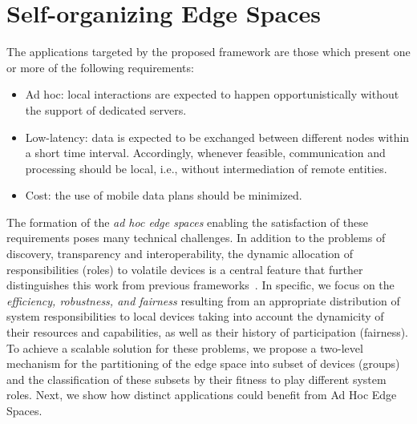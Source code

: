 \section{Self-organizing Edge Spaces}\label{sec:edge_spaces}


The applications targeted by the proposed framework are those which present one or more of the following requirements:

\begin{itemize}

\item Ad hoc: local interactions are expected to happen opportunistically without the support of dedicated servers.

\item Low-latency: data is expected to be exchanged between different nodes within a short time interval. Accordingly, whenever feasible, communication and processing should be local, i.e., without intermediation of remote entities.

\item Cost: the use of mobile data plans should be minimized.
%
%
%


\end{itemize}

The formation  of the \textit{ad hoc edge spaces} enabling the satisfaction of these requirements poses many technical challenges. In addition to the problems of discovery, transparency and interoperability, the dynamic allocation of responsibilities (roles) to volatile devices is a central feature that further distinguishes this work from previous frameworks~\cite{}. In specific, we focus on the \textit{efficiency, robustness, and fairness} resulting from an appropriate distribution of system responsibilities to local devices taking into account the dynamicity of their resources and capabilities, as well as their history of participation (fairness). To achieve a scalable solution for these problems, we propose a two-level mechanism for the partitioning of the edge space into subset of devices (groups) and the classification of these subsets by their fitness to play different system roles. Next, we show how distinct applications could benefit from Ad Hoc Edge Spaces.

